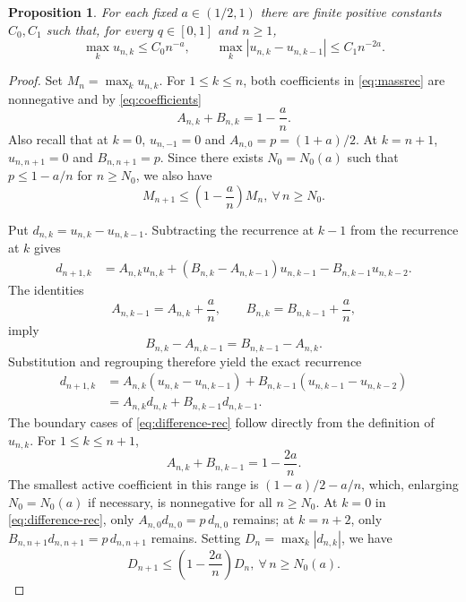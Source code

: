 \documentclass[10pt,a4paper]{amsart}
\newtheorem{proposition}{Proposition}
\begin{document}
\begin{proposition}\label{prop:lattice}
For each fixed $a\in(1/2,1)$ there are finite positive constants $C_0,C_1$ such that,
for every $q\in[0,1]$ and $n\geq1$,
\begin{equation}\label{eq:lattice-bounds}
 \max_k u_{n,k}\leq C_0n^{-a},
 \qquad
 \max_k|u_{n,k}-u_{n,k-1}|\leq C_1n^{-2a}.
\end{equation}
\end{proposition}

\begin{proof}
Set $M_n=\max_k u_{n,k}$. For $1\leq k\leq n$, both coefficients in
\eqref{eq:massrec} are nonnegative and by \eqref{eq:coefficients}
\[
 A_{n,k}+B_{n,k}=1-\frac an.
\]
Also recall that at $k=0$, $u_{n,-1}=0$ and $A_{n,0}=p=(1+a)/2$. At $k=n+1$,
$u_{n,n+1}=0$ and $B_{n,n+1}=p$. Since there exists $N_0 = N_0(a)$ such that $p \le 1- a/n$ for $n\ge N_0$, we also have 
\begin{equation}\label{eq:mass-contraction}
 M_{n+1}\leq\left(1-\frac an\right)M_n, \ \forall \, n\ge N_0.
\end{equation}

Put $d_{n,k}=u_{n,k}-u_{n,k-1}$. Subtracting the recurrence at $k-1$ from
the recurrence at $k$ gives
\begin{align*}
 d_{n+1,k}
 &=A_{n,k}u_{n,k}+(B_{n,k}-A_{n,k-1})u_{n,k-1}
   -B_{n,k-1}u_{n,k-2}.
\end{align*}
The identities
\[
 A_{n,k-1}=A_{n,k}+\frac an,
 \qquad B_{n,k}=B_{n,k-1}+\frac an,
\]
imply
\[
 B_{n,k}-A_{n,k-1}=B_{n,k-1}-A_{n,k}.
\]
Substitution and regrouping therefore yield the exact recurrence
\begin{equation}\label{eq:difference-rec}
 \begin{aligned}
 d_{n+1,k}
 &=A_{n,k}(u_{n,k}-u_{n,k-1})
   +B_{n,k-1}(u_{n,k-1}-u_{n,k-2})\\
 &=A_{n,k}d_{n,k}+B_{n,k-1}d_{n,k-1}.
 \end{aligned}
\end{equation}
The boundary cases of \eqref{eq:difference-rec} follow directly from the
definition of $u_{n,k}$. For
$1\leq k\leq n+1$,
\[
 A_{n,k}+B_{n,k-1}=1-\frac{2a}{n}.
\]
The smallest active coefficient in this range is
$(1-a)/2-a/n$, which, enlarging $N_0 = N_0(a)$ if necessary, is nonnegative for all $n \ge N_0$. At $k=0$ in \eqref{eq:difference-rec}, only
$A_{n,0}d_{n,0}=p\,d_{n,0}$ remains; at
$k=n+2$, only
$B_{n,n+1}d_{n,n+1}=p\,d_{n,n+1}$ remains. Setting $D_n=\max_k|d_{n,k}|$, we have
\begin{equation}\label{eq:difference-contraction}
 D_{n+1}\leq\left(1-\frac{2a}{n}\right)D_n , \ \forall \, n\ge N_0(a).
\end{equation}


\end{proof}
\end{document}
